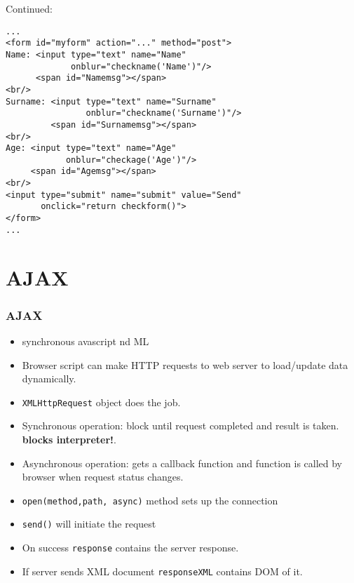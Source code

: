 \documentclass[trans,compress,xcolor=table]{beamer}
\begin{document}
\begin{frame}[fragile]
Continued:
\begin{lstlisting}
...
<form id="myform" action="..." method="post">
Name: <input type="text" name="Name" 
             onblur="checkname('Name')"/>
      <span id="Namemsg"></span>
<br/>
Surname: <input type="text" name="Surname" 
                onblur="checkname('Surname')"/>
         <span id="Surnamemsg"></span>
<br/>
Age: <input type="text" name="Age" 
            onblur="checkage('Age')"/>
     <span id="Agemsg"></span>
<br/>
<input type="submit" name="submit" value="Send" 
       onclick="return checkform()">
</form>
...
\end{lstlisting}
\end{frame}

\section{AJAX}
\begin{frame}
\frametitle{AJAX}
\begin{itemize}
\item {}synchronous avascript nd ML 
\item Browser script can make HTTP requests to web server to 
load/update data dynamically.
\item \lstinline!XMLHttpRequest! object does the job.
\item Synchronous operation: block until request completed and result is taken.
	\textbf{blocks interpreter!}. 
\item Asynchronous operation: gets a callback function and function is called
	by browser when request status changes.
\item \lstinline!open(method,path, async)! method sets up the connection
\item \lstinline!send()! will initiate the request
\item On success \lstinline!response! contains the server response.
\item If server sends XML document \lstinline!responseXML! contains DOM of it.
\end{itemize}
\end{frame}
\end{document}
